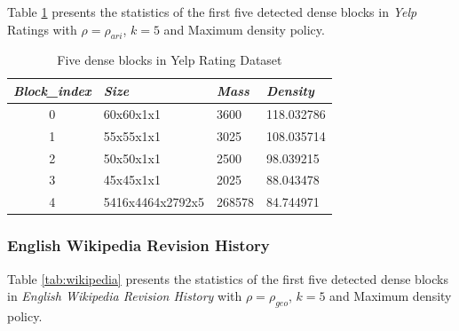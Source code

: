 Table \ref{tab:yelp} presents the statistics of the first five detected dense blocks in \textit{Yelp} Ratings with $\rho=\rho_{ari}$, $k=5$ and Maximum density policy.  


\renewcommand{\arraystretch}{1.5}
\begin{table}[!ht]
\centering
\caption{Five dense blocks in Yelp Rating Dataset}
\label{tab:yelp}
\begin{tabular}{|c|p{4cm}|p{2cm}|p{3cm}|}
\hline
\textit{\textbf{Block\_index}} & \textit{\textbf{Size}} & \textit{\textbf{Mass}} & \textit{\textbf{Density}} \\ \hline
{0}                     & 60x60x1x1                 & 3600                               & 118.032786                           \\ \hline
{1}                     & 55x55x1x1                 & 3025                               & 108.035714                           \\ \hline
{2}                     & 50x50x1x1                 & 2500                               & 98.039215                           \\ \hline
{3}                     & 45x45x1x1                  & 2025                                & 88.043478                           \\ \hline
{4}                     & 5416x4464x2792x5                 & 268578                                & 84.744971                           \\ \hline
\end{tabular}
\end{table}



\subsubsection{English Wikipedia Revision History}

Table \ref{tab:wikipedia} presents the statistics of the first five detected dense blocks in \textit{English Wikipedia Revision History} with $\rho=\rho_{geo}$, $k=5$ and Maximum density policy.  



